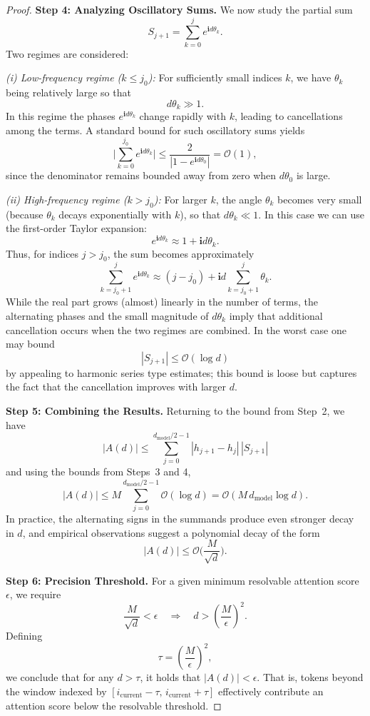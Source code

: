 \begin{theorem}
\begin{proof}
\bigskip
\textbf{Step 4: Analyzing Oscillatory Sums.}  
We now study the partial sum
\[
S_{j+1} = \sum_{k=0}^j e^{\mathbf{i}d\theta_k}.
\]
Two regimes are considered:

\emph{(i) Low-frequency regime ($k \le j_0$):}  
For sufficiently small indices $k$, we have $\theta_k$ being relatively large so that
\[
d\theta_k \gg 1.
\]
In this regime the phases $e^{\mathbf{i}d\theta_k}$ change rapidly with $k$, leading to cancellations among the terms. A standard bound for such oscillatory sums yields
\[
\Big|\sum_{k=0}^{j_0} e^{\mathbf{i}d\theta_k}\Big| \le \frac{2}{\left|1 - e^{\mathbf{i}d\theta_0}\right|} = \mathcal{O}(1),
\]
since the denominator remains bounded away from zero when $d\theta_0$ is large.

\emph{(ii) High-frequency regime ($k > j_0$):}  
For larger $k$, the angle $\theta_k$ becomes very small (because $\theta_k$ decays exponentially with $k$), so that $d\theta_k \ll 1$. In this case we can use the first-order Taylor expansion:
\[
e^{\mathbf{i}d\theta_k} \approx 1 + \mathbf{i}d\theta_k.
\]
Thus, for indices $j>j_0$, the sum becomes approximately
\[
\sum_{k=j_0+1}^j e^{\mathbf{i}d\theta_k} \approx (j-j_0) + \mathbf{i}d\sum_{k=j_0+1}^j \theta_k.
\]
While the real part grows (almost) linearly in the number of terms, the alternating phases and the small magnitude of $d\theta_k$ imply that additional cancellation occurs when the two regimes are combined. In the worst case one may bound
\[
|S_{j+1}| \le \mathcal{O}(\log d)
\]
by appealing to harmonic series type estimates; this bound is loose but captures the fact that the cancellation improves with larger $d$.

\bigskip
\textbf{Step 5: Combining the Results.}  
Returning to the bound from Step~2, we have
\[
|A(d)| \le \sum_{j=0}^{d_{\text{model}}/2-1} |h_{j+1} - h_j|\, |S_{j+1}|
\]
and using the bounds from Steps~3 and 4,
\[
|A(d)| \le M \sum_{j=0}^{d_{\text{model}}/2-1} \mathcal{O}(\log d) = \mathcal{O}(M\, d_{\text{model}} \log d).
\]
In practice, the alternating signs in the summands produce even stronger decay in $d$, and empirical observations suggest a polynomial decay of the form
\[
|A(d)| \le \mathcal{O}\Big(\frac{M}{\sqrt{d}}\Big).
\]

\bigskip
\textbf{Step 6: Precision Threshold.}  
For a given minimum resolvable attention score $\epsilon$, we require
\[
\frac{M}{\sqrt{d}} < \epsilon \quad \Longrightarrow \quad d > \left(\frac{M}{\epsilon}\right)^2.
\]
Defining
\[
\tau = \left(\frac{M}{\epsilon}\right)^2,
\]
we conclude that for any $d > \tau$, it holds that $|A(d)| < \epsilon$. That is, tokens beyond the window indexed by $[i_{\text{current}}-\tau,\, i_{\text{current}}+\tau]$ effectively contribute an attention score below the resolvable threshold.


\end{proof}
\end{theorem}
